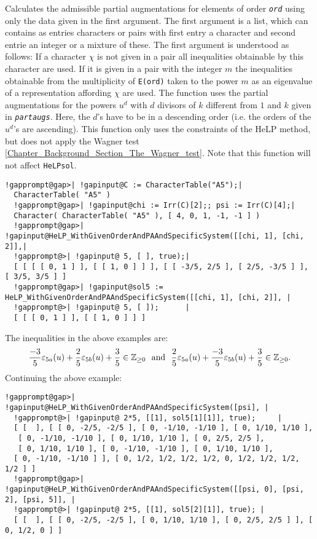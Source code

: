 \documentclass[a4paper,11pt]{report}
\begin{document}
{{{ Calculates the admissible partial augmentations for elements of order \mbox{\texttt{\mdseries\slshape ord}} using only the data given in the first argument. The first argument is a list,
which can contains as entries characters or pairs with first entry a character
and second entrie an integer or a mixture of these. The first argument is
understood as follows: If a character $\chi$ is not given in a pair all inequalities obtainable by this character are used.
If it is given in a pair with the integer $m$ the inequalities obtainable from the multiplicity of \texttt{E(ord)} taken to the power $m$ as an eigenvalue of a representation affording $\chi$ are used. The function uses the partial augmentations for the powers $u^d$ with $d$ divisors of $k$ different from $1$ and $k$ given in \mbox{\texttt{\mdseries\slshape partaugs}}. Here, the $d$'s have to be in a descending order (i.e. the orders of the $u^d$'s are ascending). This function only uses the constraints of the HeLP method,
but does not apply the Wagner test \ref{Chapter_Background_Section_The_Wagner_test}. Note that this function will not affect \texttt{HeLP{\textunderscore}sol}. }

 
\begin{Verbatim}[commandchars=!@|,fontsize=\small,frame=single,label=Example]
  !gapprompt@gap>| !gapinput@C := CharacterTable("A5");|
  CharacterTable( "A5" )
  !gapprompt@gap>| !gapinput@chi := Irr(C)[2];; psi := Irr(C)[4];|
  Character( CharacterTable( "A5" ), [ 4, 0, 1, -1, -1 ] )
  !gapprompt@gap>| !gapinput@HeLP_WithGivenOrderAndPAAndSpecificSystem([[chi, 1], [chi, 2]],|
  !gapprompt@>| !gapinput@ 5, [ ], true);|
  [ [ [ [ 0, 1 ] ], [ [ 1, 0 ] ] ], [ [ -3/5, 2/5 ], [ 2/5, -3/5 ] ], [ 3/5, 3/5 ] ]
  !gapprompt@gap>| !gapinput@sol5 := HeLP_WithGivenOrderAndPAAndSpecificSystem([[chi, 1], [chi, 2]], |
  !gapprompt@>| !gapinput@ 5, [ ]);      |
  [ [ [ 0, 1 ] ], [ [ 1, 0 ] ] ]
\end{Verbatim}
 The inequalities in the above examples are: 
\[\frac{-3}{5}\varepsilon_{5a}(u) + \frac{2}{5}\varepsilon_{5b}(u) + \frac{3}{5}
\in \mathbb{Z}_{\geq 0} \ \ {\rm{and}} \ \ \frac{2}{5}\varepsilon_{5a}(u) +
\frac{-3}{5}\varepsilon_{5b}(u) + \frac{3}{5} \in \mathbb{Z}_{\geq 0}. \]
 Continuing the above example: 
\begin{Verbatim}[commandchars=!@|,fontsize=\small,frame=single,label=Example]
  !gapprompt@gap>| !gapinput@HeLP_WithGivenOrderAndPAAndSpecificSystem([psi], |
  !gapprompt@>| !gapinput@ 2*5, [[1], sol5[1][1]], true);     |
  [ [  ], [ [ 0, -2/5, -2/5 ], [ 0, -1/10, -1/10 ], [ 0, 1/10, 1/10 ],
   [ 0, -1/10, -1/10 ], [ 0, 1/10, 1/10 ], [ 0, 2/5, 2/5 ], 
   [ 0, 1/10, 1/10 ], [ 0, -1/10, -1/10 ], [ 0, 1/10, 1/10 ], 
  [ 0, -1/10, -1/10 ] ], [ 0, 1/2, 1/2, 1/2, 1/2, 0, 1/2, 1/2, 1/2, 1/2 ] ]
  !gapprompt@gap>| !gapinput@HeLP_WithGivenOrderAndPAAndSpecificSystem([[psi, 0], [psi, 2], [psi, 5]], |
  !gapprompt@>| !gapinput@ 2*5, [[1], sol5[2][1]], true); |
  [ [  ], [ [ 0, -2/5, -2/5 ], [ 0, 1/10, 1/10 ], [ 0, 2/5, 2/5 ] ], [ 0, 1/2, 0 ] ]
\end{Verbatim}
 }

}
\end{document}

